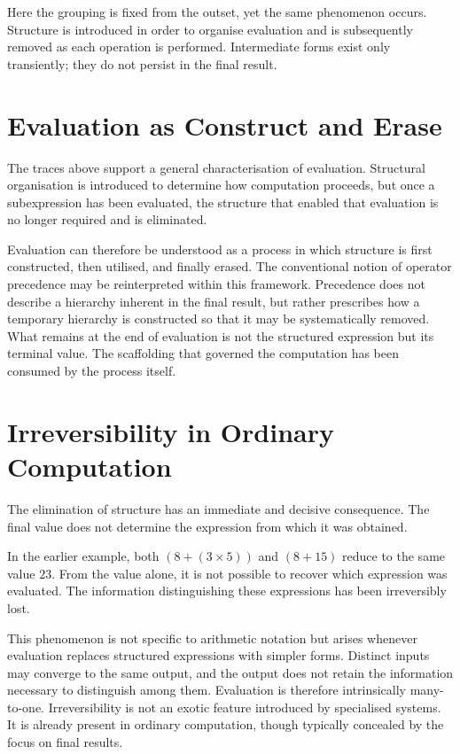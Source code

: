 \documentclass[12pt, oneside]{amsbook}
\theoremstyle{plain}
\theoremstyle{definition}
\theoremstyle{remark}
\begin{document}
Here the grouping is fixed from the outset, yet the same phenomenon occurs.
Structure is introduced in order to organise evaluation and is subsequently
removed as each operation is performed. Intermediate forms exist only
transiently; they do not persist in the final result.

\section{Evaluation as Construct and Erase}
\label{sec:visible:construct-erase}

The traces above support a general characterisation of evaluation. Structural
organisation is introduced to determine how computation proceeds, but once a
subexpression has been evaluated, the structure that enabled that evaluation is
no longer required and is eliminated.

Evaluation can therefore be understood as a process in which structure is first
constructed, then utilised, and finally erased. The conventional notion of
operator precedence may be reinterpreted within this framework. Precedence does
not describe a hierarchy inherent in the final result, but rather prescribes
how a temporary hierarchy is constructed so that it may be systematically
removed. What remains at the end of evaluation is not the structured expression
but its terminal value. The scaffolding that governed the computation has been
consumed by the process itself.

\section{Irreversibility in Ordinary Computation}
\label{sec:visible:irreversibility}

The elimination of structure has an immediate and decisive consequence. The
final value does not determine the expression from which it was obtained.

In the earlier example, both $(8 + (3 \times 5))$ and $(8 + 15)$ reduce to the
same value $23$. From the value alone, it is not possible to recover which
expression was evaluated. The information distinguishing these expressions has
been irreversibly lost.

This phenomenon is not specific to arithmetic notation but arises whenever
evaluation replaces structured expressions with simpler forms. Distinct inputs
may converge to the same output, and the output does not retain the information
necessary to distinguish among them. Evaluation is therefore intrinsically
many-to-one. Irreversibility is not an exotic feature introduced by specialised
systems. It is already present in ordinary computation, though typically
concealed by the focus on final results.
\end{document}
